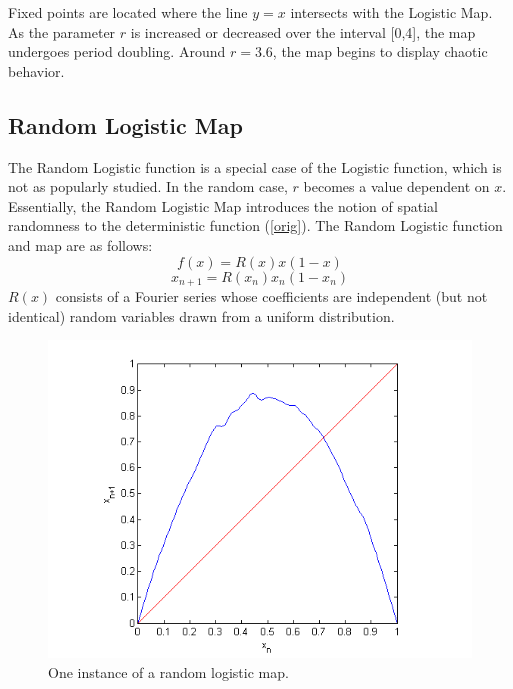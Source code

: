 \documentclass[12pt]{article}
\begin{document}
Fixed points are located where the line $y=x$ intersects with the
Logistic Map. As the parameter $r$ is increased or decreased over the
interval [0,4], the map undergoes period doubling. Around $r=3.6$, the
map begins to display chaotic behavior.

\subsection{Random Logistic Map}
The Random Logistic function is a special case of the Logistic
function, which is not as popularly studied. In the random case, $r$ becomes a value dependent on $x$. Essentially, the Random Logistic
Map introduces the notion of spatial randomness to the deterministic
function (\ref{orig}). The Random Logistic function and map are as follows:
\begin{equation*}
f(x) = R(x)x(1-x)
\end{equation*}
\begin{equation}\label{randmap}
x_{n+1} = R(x_n)x_n(1-x_n)
\end{equation}
$R(x)$ consists of a Fourier series whose coefficients are independent
(but not identical) random variables drawn from a uniform
distribution. 
\begin{figure}[H]
	\begin{center}
		\includegraphics[scale=0.7]{random_cobweb}
\caption{One instance of a random logistic map.}
	\end{center}
\end{figure}
\end{document}
